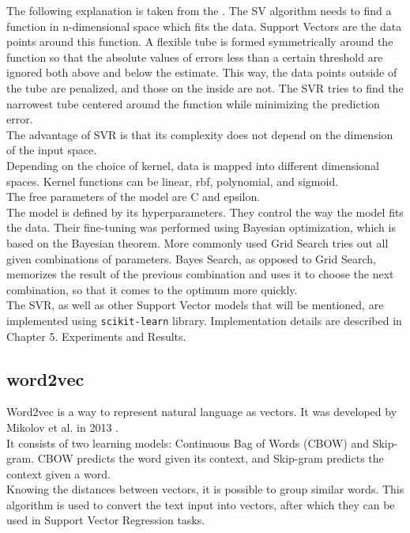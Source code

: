 \documentclass[times, utf8, zavrsni, english]{fer}
\begin{document}
\noindent The following explanation is taken from the \citep{Awad2015}.
The SV algorithm needs to find a function in n-dimensional space which fits the data. 
Support Vectors are the data points around this function. A flexible tube is formed symmetrically around the function so that the absolute values of errors less than a certain threshold are ignored both above and below the estimate. This way, the data points outside of the tube are penalized, and those on the inside are not.
The SVR tries to find the narrowest tube centered around the function while minimizing the prediction error.  \\
The advantage of SVR is that its complexity does not depend on the dimension of the input space. \\

\noindent Depending on the choice of kernel, data is mapped into different dimensional spaces. Kernel functions can be linear, rbf, polynomial, and sigmoid. \\
The free parameters of the model are C and epsilon. \\
The model is defined by its hyperparameters. They control the way the model fits the data. Their fine-tuning was performed using Bayesian optimization, which is based on the Bayesian theorem. More commonly used Grid Search tries out all given combinations of parameters. Bayes Search, as opposed to Grid Search, memorizes the result of the previous combination and uses it to choose the next combination, so that it comes to the optimum more quickly. \citep{WU201926} \\

\noindent The SVR, as well as other Support Vector models that will be mentioned, are implemented using \texttt{scikit-learn} library. Implementation details are described in Chapter 5. Experiments and Results.

\subsection{word2vec}
Word2vec is a way to represent natural language as vectors. It was developed by Mikolov et al. in 2013 \citep{mikolov}. \\
It consists of two learning models: Continuous Bag of Words (CBOW) and Skip-gram. CBOW predicts the word given its context, and Skip-gram predicts the context given a word. \citep{ma} \\
Knowing the distances between vectors, it is possible to group similar words.
This algorithm is used to convert the text input into vectors, after which they can be used in Support Vector Regression tasks.
\end{document}
